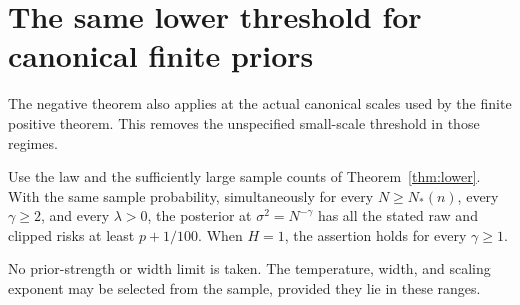 \section{The same lower threshold for canonical finite priors}
\label{sec:canonical-negative}
The negative theorem also applies at the actual canonical scales used by the finite positive theorem. This removes the unspecified small-scale threshold in those regimes.

\begin{theorem}
\label{thm:canonical-negative}
Use the law and the sufficiently large sample counts of Theorem~\ref{thm:lower}. With the same sample probability, simultaneously for every $N\ge N_*(n)$, every $\gamma\ge2$, and every $\lambda>0$, the posterior at $\sigma^2=N^{-\gamma}$ has all the stated raw and clipped risks at least $p+1/100$. When $H=1$, the assertion holds for every $\gamma\ge1$.

No prior-strength or width limit is taken. The temperature, width, and scaling exponent may be selected from the sample, provided they lie in these ranges.
\end{theorem}
